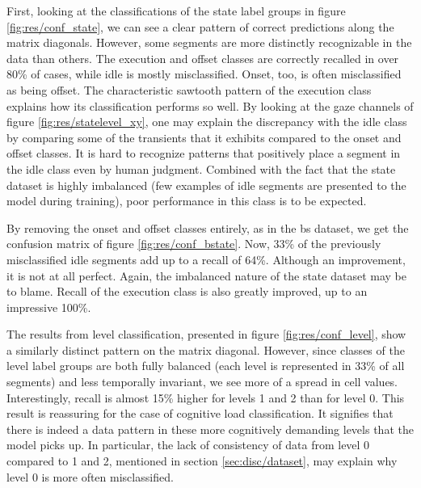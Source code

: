 First, looking at the classifications of the state label groups in figure \ref{fig:res/conf_state}, we can see a clear pattern of correct predictions along the matrix diagonals. However, some segments are more distinctly recognizable in the data than others. The execution and offset classes are correctly recalled in over 80\% of cases, while idle is mostly misclassified. Onset, too, is often misclassified as being offset. The characteristic sawtooth pattern of the execution class explains how its classification performs so well. By looking at the gaze channels of figure \ref{fig:res/statelevel_xy}, one may explain the discrepancy with the idle class by comparing some of the transients that it exhibits compared to the onset and offset classes. It is hard to recognize patterns that positively place a segment in the idle class even by human judgment. Combined with the fact that the state dataset is highly imbalanced (few examples of idle segments are presented to the model during training), poor performance in this class is to be expected.

By removing the onset and offset classes entirely, as in the \acrshort{bs} dataset, we get the confusion matrix of figure \ref{fig:res/conf_bstate}. Now, 33\% of the previously misclassified idle segments add up to a recall of 64\%. Although an improvement, it is not at all perfect. Again, the imbalanced nature of the state dataset may be to blame. Recall of the execution class is also greatly improved, up to an impressive 100\%.

The results from level classification, presented in figure \ref{fig:res/conf_level}, show a similarly distinct pattern on the matrix diagonal. However, since classes of the level label groups are both fully balanced (each level is represented in 33\% of all segments) and less temporally invariant, we see more of a spread in cell values. Interestingly, recall is almost 15\% higher for levels 1 and 2 than for level 0. This result is reassuring for the case of cognitive load classification. It signifies that there is indeed a data pattern in these more cognitively demanding levels that the model picks up. In particular, the lack of consistency of data from level 0 compared to 1 and 2, mentioned in section \ref{sec:disc/dataset}, may explain why level 0 is more often misclassified. 



